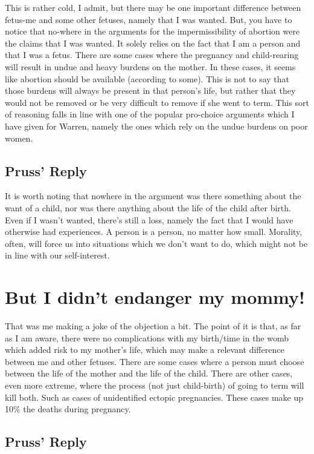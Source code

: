 This is rather cold, I admit, but there may be one important difference between fetus-me and some other fetuses, namely that I was wanted. But, you have to notice that no-where in the arguments for the impermissibility of abortion were the claims that I was wanted. It solely relies on the fact that I am a person and that I was a fetus. There are some cases where the pregnancy and child-rearing will result in undue and heavy burdens on the mother. In these cases, it seems like abortion should be available (according to some). This is not to say that those burdens will always be present in that person’s life, but rather that they would not be removed or be very difficult to remove if she went to term. This sort of reasoning falls in line with one of the popular pro-choice arguments which I have given for Warren, namely the ones which rely on the undue burdens on poor women. 
\subsection{Pruss' Reply}

It is worth noting that nowhere in the argument was there something about the want of a child, nor was there anything about the life of the child after birth. Even if I wasn’t wanted, there’s still a loss, namely the fact that I would have otherwise had experiences. A person is a person, no matter how small. Morality, often, will force us into situations which we don't want to do, which might not be in line with our self-interest. 
\section{But I didn't endanger my mommy!}

That was me making a joke of the objection a bit. The point of it is that, as far as I am aware, there were no complications with my birth/time in the womb which added risk to my mother's life, which may make a relevant difference between me and other fetuses. There are some cases where a person must choose between the life of the mother and the life of the child. There are other cases, even more extreme, where the process (not just child-birth) of going to term will kill both. Such as cases of unidentified ectopic pregnancies. These cases make up 10\% the deaths during pregnancy.
\subsection{Pruss' Reply}

